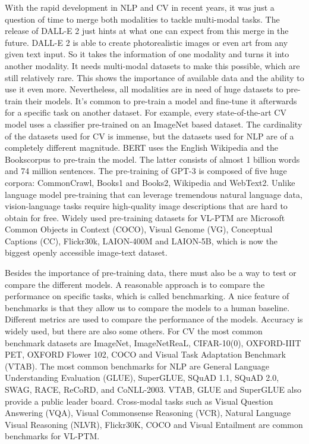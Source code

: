 \documentclass[
]{krantz}
\begin{document}
With the rapid development in NLP and CV in recent years, it was just a question of time to merge both modalities to tackle multi-modal tasks. The release of DALL-E 2 just hints at what one can expect from this merge in the future. DALL-E 2 is able to create photorealistic images or even art from any given text input. So it takes the information of one modality and turns it into another modality. It needs multi-modal datasets to make this possible, which are still relatively rare. This shows the importance of available data and the ability to use it even more. Nevertheless, all modalities are in need of huge datasets to pre-train their models. It's common to pre-train a model and fine-tune it afterwards for a specific task on another dataset. For example, every state-of-the-art CV model uses a classifier pre-trained on an ImageNet based dataset. The cardinality of the datasets used for CV is immense, but the datasets used for NLP are of a completely different magnitude. BERT uses the English Wikipedia and the Bookscorpus to pre-train the model. The latter consists of almost 1 billion words and 74 million sentences. The pre-training of GPT-3 is composed of five huge corpora: CommonCrawl, Books1 and Books2, Wikipedia and WebText2. Unlike language model pre-training that can leverage tremendous natural language data, vision-language tasks require high-quality image descriptions that are hard to obtain for free. Widely used pre-training datasets for VL-PTM are Microsoft Common Objects in Context (COCO), Visual Genome (VG), Conceptual Captions (CC), Flickr30k, LAION-400M and LAION-5B, which is now the biggest openly accessible image-text dataset.

Besides the importance of pre-training data, there must also be a way to test or compare the different models. A reasonable approach is to compare the performance on specific tasks, which is called benchmarking. A nice feature of benchmarks is that they allow us to compare the models to a human baseline. Different metrics are used to compare the performance of the models. Accuracy is widely used, but there are also some others. For CV the most common benchmark datasets are ImageNet, ImageNetReaL, CIFAR-10(0), OXFORD-IIIT PET, OXFORD Flower 102, COCO and Visual Task Adaptation Benchmark (VTAB). The most common benchmarks for NLP are General Language Understanding Evaluation (GLUE), SuperGLUE, SQuAD 1.1, SQuAD 2.0, SWAG, RACE, ReCoRD, and CoNLL-2003. VTAB, GLUE and SuperGLUE also provide a public leader board. Cross-modal tasks such as Visual Question Answering (VQA), Visual Commonsense Reasoning (VCR), Natural Language Visual Reasoning (NLVR), Flickr30K, COCO and Visual Entailment are common benchmarks for VL-PTM.
\end{document}
